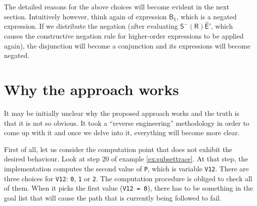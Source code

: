 \documentclass[inscr,ack,preface]{dithesis}
\theoremstyle{definition}
\newcommand{\msf}[1]{$\mathsf{#1}$}
\begin{document}
The detailed reasons for the above choices will become evident in the next section. Intuitively however, think again of expression \msf{B_1}, which is a negated expression. If we distribute the negation (after evaluating \msf{S^{-} \left( R \right) \widehat{E}'}, which causes the constructive negation rule for higher-order expressions to be applied again), the disjunction will become a conjunction and its expressions will become negated.


\section{Why the approach works}
It may be initially unclear why the proposed approach works and the truth is that it is not so obvious. It took a ``reverse engineering'' methodology in order to come up with it and once we delve into it, everything will become more clear.

First of all, let us consider the computation point that does not exhibit the desired behaviour. Look at step 20 of example \ref{ex:subsettrace}. At that step, the implementation computes the second value of \texttt{P}, which is variable \texttt{V12}. There are three choices for \texttt{V12}: \texttt{0}, \texttt{1} or \texttt{2}. The computation procedure is obliged to check all of them. When it picks the first value (\texttt{V12 = 0}), there has to be something in the goal list that will cause the path that is currently being followed to fail.
\end{document}
